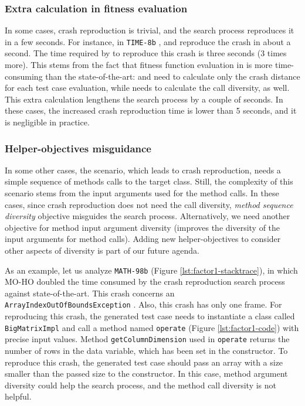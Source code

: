 \subsubsection{Extra calculation in fitness evaluation}
In some cases, crash reproduction is trivial, and the search process reproduces it in a few seconds. For instance, in \texttt{TIME-8b} \cite{just2014defects4j}, \SGGA and \decomposition reproduce the crash in about a second. The time required by \moho to reproduce this crash is three seconds (3 times more). This stems from the fact that fitness function evaluation in \moho is more time-consuming than the state-of-the-art: \SGGA and \decomposition need to calculate only the crash distance for each test case evaluation, while \moho needs to calculate the call diversity, as well. This extra calculation lengthens the search process by a couple of seconds. In these cases, the increased crash reproduction time is lower than 5 seconds, and it is negligible in practice.

\subsubsection{Helper-objectives misguidance}
In some other cases, the scenario, which leads to crash reproduction, needs a simple sequence of methods calls to the target class. Still, the complexity of this scenario stems from the input arguments used for the method calls. In these cases, since crash reproduction does not need the call diversity, \textit{method sequence diversity} objective misguides the search process. Alternatively, we need another objective for method input argument diversity (\ie improves the diversity of the input arguments for method calls). Adding new helper-objectives to consider other aspects of diversity is part of our future agenda. 

As an example, let us analyze \texttt{MATH-98b} (Figure \ref{lst:factor1-stacktrace}), in which MO-HO doubled the time consumed by the crash reproduction search process against state-of-the-art. This crash concerns an \texttt{ArrayIndexOutOfBounds\-Exception} .
Also, this crash has only one frame. For reproducing this crash, the generated test case needs to instantiate a class called \texttt{BigMatrixImpl} and call a method named \texttt{operate} (Figure \ref{lst:factor1-code}) with precise input values. Method \texttt{getColumnDimension} used in \texttt{operate} returns the number of rows in the data variable, which has been set in the constructor. To reproduce this crash, the generated test case should pass an array with a size smaller than the passed size to the constructor. In this case, method argument diversity could help the search process, and the method call diversity is not helpful.